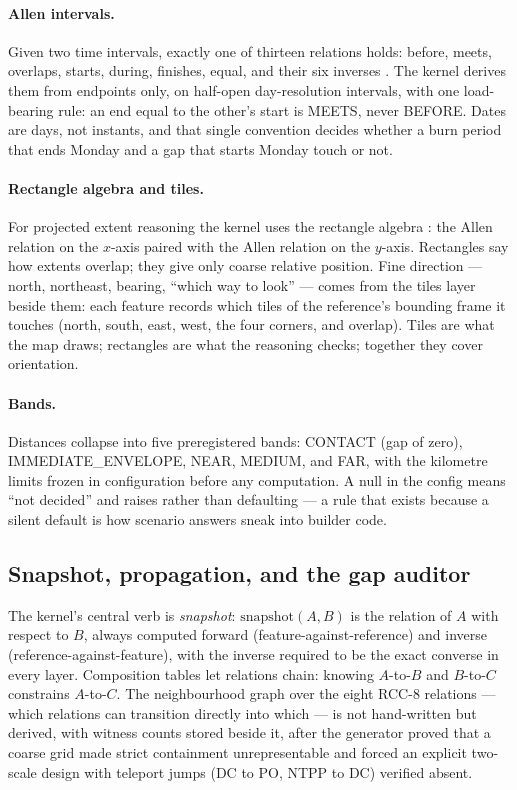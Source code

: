 \documentclass[11pt]{article}
\begin{document}
\paragraph{Allen intervals.} Given two time intervals, exactly one of thirteen
relations holds: before, meets, overlaps, starts, during, finishes, equal, and
their six inverses \cite{allen1983}. The kernel derives them from endpoints
only, on half-open day-resolution intervals, with one load-bearing rule: an
end equal to the other's start is MEETS, never BEFORE. Dates are days, not
instants, and that single convention decides whether a burn period that ends
Monday and a gap that starts Monday touch or not.

\paragraph{Rectangle algebra and tiles.} For projected extent reasoning the
kernel uses the rectangle algebra \cite{guesgen1989}: the Allen relation on
the $x$-axis paired with the Allen relation on the $y$-axis. Rectangles say
how extents overlap; they give only coarse relative position. Fine direction
--- north, northeast, bearing, ``which way to look'' --- comes from the tiles
layer beside them: each feature records which tiles of the reference's
bounding frame it touches (north, south, east, west, the four corners, and
overlap). Tiles are what the map draws; rectangles are what the reasoning
checks; together they cover orientation.

\paragraph{Bands.} Distances collapse into five preregistered bands: CONTACT
(gap of zero), IMMEDIATE\_ENVELOPE, NEAR, MEDIUM, and FAR, with the kilometre
limits frozen in configuration before any computation. A null in the config
means ``not decided'' and raises rather than defaulting --- a rule that
exists because a silent default is how scenario answers sneak into builder
code.

\subsection{Snapshot, propagation, and the gap auditor}

The kernel's central verb is \emph{snapshot}: $\mathrm{snapshot}(A,B)$ is the
relation of $A$ with respect to $B$, always computed forward
(feature-against-reference) and inverse (reference-against-feature), with the
inverse required to be the exact converse in every layer. Composition tables
let relations chain: knowing $A$-to-$B$ and $B$-to-$C$ constrains $A$-to-$C$.
The neighbourhood graph over the eight RCC-8 relations --- which relations
can transition directly into which --- is not hand-written but derived, with
witness counts stored beside it, after the generator proved that a coarse
grid made strict containment unrepresentable and forced an explicit two-scale
design with teleport jumps (DC to PO, NTPP to DC) verified absent.
\end{document}
